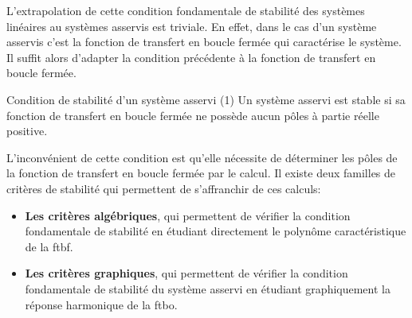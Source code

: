 %    
L'extrapolation de cette condition fondamentale de stabilité des systèmes 
linéaires au systèmes asservis est triviale. En effet, dans le cas d'un 
système asservis c'est la fonction de transfert en boucle fermée qui 
caractérise le système. Il suffit alors d'adapter la condition précédente à la
fonction de transfert en boucle fermée.
\begin{criteria}{Condition de stabilité d'un système asservi (1)}
         Un système asservi est stable si sa fonction de transfert en 
         boucle fermée ne possède aucun pôles à partie réelle positive.
\end{criteria}
L'inconvénient de cette condition est qu'elle nécessite de déterminer les
pôles de la fonction de transfert en boucle fermée par le calcul. Il existe
deux familles de critères de stabilité qui permettent de s'affranchir de 
ces calculs:
\begin{itemize}
    \item \textbf{Les critères algébriques}, qui permettent de vérifier 
        la condition fondamentale de stabilité en étudiant directement 
        le polynôme caractéristique de la \gls{ftbf}.
    \item \textbf{Les critères graphiques}, qui permettent de vérifier 
        la condition fondamentale de stabilité du système asservi en 
        étudiant graphiquement la réponse harmonique de la \gls{ftbo}.
\end{itemize}
